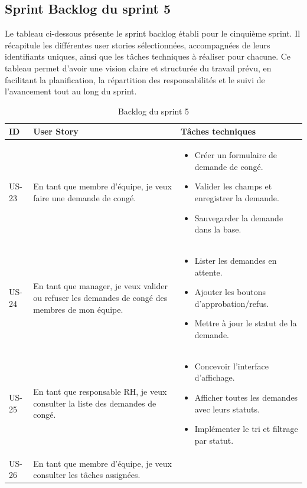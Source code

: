 \subsection{ Sprint Backlog du sprint 5}
Le tableau ci-dessous présente le sprint backlog établi pour le cinquième sprint. Il récapitule les différentes user stories sélectionnées, accompagnées de leurs identifiants uniques, ainsi que les tâches techniques à réaliser pour chacune. Ce tableau permet d’avoir une vision claire et structurée du travail prévu, en facilitant la planification, la répartition des responsabilités et le suivi de l’avancement tout au long du sprint.
\begin{table}[H]
\caption{Backlog du sprint 5}
\centering
\begin{tabular}{|p{1cm}|p{8cm}|p{8cm}|}
\hline
\textbf{ID} & \textbf{User Story} & \textbf{Tâches techniques} \\
\hline
US-23 & En tant que membre d’équipe, je veux faire une demande de congé. 
& 
\begin{itemize}[leftmargin=*]
  \item Créer un formulaire de demande de congé.
  \item Valider les champs et enregistrer la demande.
  \item Sauvegarder la demande dans la base.
\end{itemize} \\
\hline
US-24 & En tant que manager, je veux valider ou refuser les demandes de congé des membres de mon équipe. 
& 
\begin{itemize}[leftmargin=*]
  \item Lister les demandes en attente.
  \item Ajouter les boutons d'approbation/refus.
  \item Mettre à jour le statut de la demande.
\end{itemize} \\
\hline
US-25 & En tant que responsable RH, je veux consulter la liste des demandes de congé. 
& 
\begin{itemize}[leftmargin=*]
  \item Concevoir l’interface d’affichage.
  \item Afficher toutes les demandes avec leurs statuts.
  \item Implémenter le tri et filtrage par statut.
\end{itemize} \\
\hline
US-26 & En tant que membre d’équipe, je veux consulter les tâches assignées. 

\end{tabular}
\end{table}
